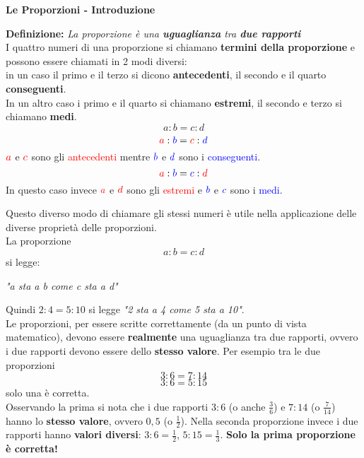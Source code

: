 \documentclass[14pt]{extarticle}
\begin{document}
\begin{center}
    \LARGE{\textbf{Le Proporzioni - Introduzione}}
\end{center}
\vspace{1cm}
\textbf{Definizione:} \textit{La proporzione è una \textbf{uguaglianza} tra \textbf{due rapporti}}\\

I quattro numeri di una proporzione si chiamano \textbf{termini della proporzione} e possono essere chiamati in 2 modi diversi:\\
in un caso il primo e il terzo si dicono \textbf{antecedenti}, il secondo e il quarto \textbf{conseguenti}.\\
In un altro caso i primo e il quarto si chiamano \textbf{estremi}, il secondo e terzo si chiamano \textbf{medi}.\\
\[a:b=c:d\]
\[\textcolor{red}{a}:\textcolor{blue}{b}=\textcolor{red}{c}:\textcolor{blue}{d}\]
\(\textcolor{red}{a}\) e \(\textcolor{red}{c}\) sono gli \textcolor{red}{antecedenti} mentre \(\textcolor{blue}{b}\) e \(\textcolor{blue}{d}\) sono i \textcolor{blue}{conseguenti}.
\[\textcolor{red}{a}:\textcolor{blue}{b}=\textcolor{blue}{c}:\textcolor{red}{d}\]
In questo caso invece \(\textcolor{red}{a}\) e \(\textcolor{red}{d}\) sono gli \textcolor{red}{estremi} e \(\textcolor{blue}{b}\) e \(\textcolor{blue}{c}\) sono i \textcolor{blue}{medi}.

Questo diverso modo di chiamare gli stessi numeri è utile nella applicazione delle diverse proprietà delle proporzioni.\\
La proporzione  
\[a:b=c:d\]
si legge: \\
\begin{center}
    \textit{"a sta a b come c sta a d"}
\end{center}
Quindi \(2:4=5:10\) si legge \textit{"2 sta a 4 come 5 sta a 10"}.\\
Le proporzioni, per essere scritte correttamente (da un punto di vista matematico), devono essere \textbf{realmente} una uguaglianza tra due rapporti, ovvero i due rapporti devono essere dello \textbf{stesso valore}. Per esempio tra le due proporzioni
\[3:6=7:14\]
\[3:6=5:15\]
solo una è corretta. \\
Osservando la prima si nota che i due rapporti \(3:6\) (o anche \(\frac{3}{6}\)) e \(7:14\) (o \(\frac{7}{14}\)) hanno lo \textbf{stesso valore}, ovvero \(0,5\) (o \(\frac{1}{2}\)). Nella seconda proporzione invece i due rapporti hanno \textbf{valori diversi}: \(3:6=\frac{1}{2}\), \(5:15=\frac{1}{3}\). \textbf{Solo la prima proporzione è corretta!}\\
\end{document}
